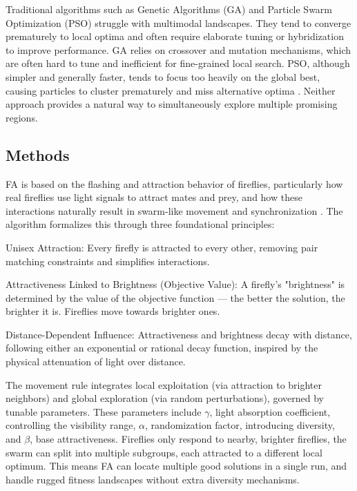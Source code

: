 \documentclass[a4paper, 12pt]{extarticle}
\begin{document}
Traditional algorithms such as Genetic Algorithms (GA) and Particle Swarm Optimization (PSO) struggle with multimodal landscapes. They tend to converge prematurely to local optima and often require elaborate tuning or hybridization to improve performance. GA relies on crossover and mutation mechanisms, which are often hard to tune and inefficient for fine-grained local search. PSO, although simpler and generally faster, tends to focus too heavily on the global best, causing particles to cluster prematurely and miss alternative optima \cite{yang2009firefly}. Neither approach provides a natural way to simultaneously explore multiple promising regions. 

\subsection{Methods}

FA is based on the flashing and attraction behavior of fireflies, particularly how real fireflies use light signals to attract mates and prey, and how these interactions naturally result in swarm-like movement and synchronization \cite{yang2009firefly}. The algorithm formalizes this through three foundational principles: 

Unisex Attraction: Every firefly is attracted to every other, removing pair matching constraints and simplifies interactions. 

Attractiveness Linked to Brightness (Objective Value): A firefly’s "brightness" is determined by the value of the objective function — the better the solution, the brighter it is. Fireflies move towards brighter ones. 

Distance-Dependent Influence: Attractiveness and brightness decay with distance, following either an exponential or rational decay function, inspired by the physical attenuation of light over distance. 

The movement rule integrates local exploitation (via attraction to brighter neighbors) and global exploration (via random perturbations), governed by tunable parameters. These parameters include $\gamma$, light absorption coefficient, controlling the visibility range, $\alpha$, randomization factor, introducing diversity, and $\beta$, base attractiveness. Fireflies only respond to nearby, brighter fireflies, the swarm can split into multiple subgroups, each attracted to a different local optimum. This means FA can locate multiple good solutions in a single run,  and handle rugged fitness landscapes without extra diversity mechanisms. 
\end{document}
